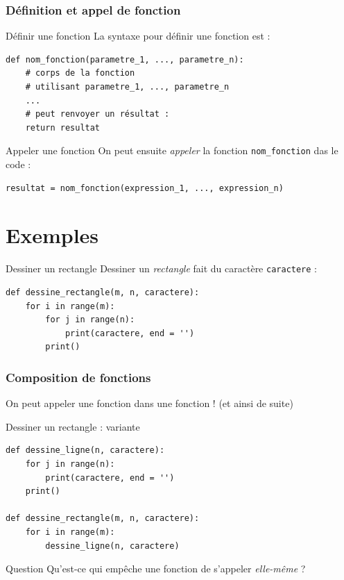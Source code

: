 \documentclass[x11names,svgnames]{beamer}
\begin{document}
\begin{frame}[fragile]
  \frametitle{Définition et appel de fonction}

  \begin{block}{Définir une fonction}
    \vspace{0pt}
    La syntaxe pour définir une fonction est :
    
\begin{verbatim}
def nom_fonction(parametre_1, ..., parametre_n):
    # corps de la fonction
    # utilisant parametre_1, ..., parametre_n
    ...
    # peut renvoyer un résultat :
    return resultat
\end{verbatim}
  \end{block}
  \pause
  \begin{block}{Appeler une fonction}
    \vspace{0pt}
    On peut ensuite \emph{appeler} la fonction \texttt{nom_fonction} das le code :
\begin{verbatim}
resultat = nom_fonction(expression_1, ..., expression_n)
\end{verbatim}
  \end{block}
\end{frame}

\section{Exemples}

\begin{frame}[fragile]{Dessiner un rectangle}
  Dessiner un \emph{rectangle} fait du caractère \texttt{caractere} :
  \pause
\begin{verbatim}
def dessine_rectangle(m, n, caractere):
    for i in range(m):
        for j in range(n):
            print(caractere, end = '')
        print()
\end{verbatim}
\end{frame}

\begin{frame}[fragile]
  \frametitle{Composition de fonctions}
  
  On peut appeler une fonction dans une fonction ! (et ainsi de suite)

  \pause

  \begin{block}{Dessiner un rectangle : variante}
\begin{verbatim}
def dessine_ligne(n, caractere):
    for j in range(n):
        print(caractere, end = '')
    print()

def dessine_rectangle(m, n, caractere):
    for i in range(m):
        dessine_ligne(n, caractere)
\end{verbatim}
  \end{block}

  \pause
  \begin{alertblock}{Question}
    \vspace{0pt}
\MVRightarrow{} Qu'est-ce qui empêche une fonction de s'appeler \emph{elle-même} ?
\end{alertblock}
\end{frame}
\end{document}
